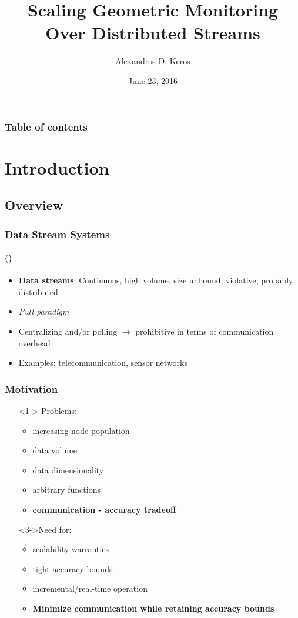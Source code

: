 \documentclass[hyperref={pdfpagelabels=false}]{beamer}
\title{Scaling Geometric Monitoring Over Distributed Streams}
\author{Alexandros D. Keros}
\date{June 23, 2016}
\begin{document}
\begin{frame}
\titlepage
\end{frame} 


\begin{frame}
\frametitle{Table of contents}
\tableofcontents
\end{frame} 

\section{Introduction}
\begin{frame}
  \tableofcontents[currentsection]
 \end{frame}
 
\subsection*{Overview}
\begin{frame} \frametitle{Data Stream Systems}\framesubtitle{\tiny()}
\begin{itemize}
\item \textbf{Data streams}: Continuous, high volume, size unbound, violative, probably distributed
\item \emph{Pull paradigm}
\item Centralizing and/or polling $\rightarrow$ prohibitive in terms of communication overhead
\item Examples: telecommunication, sensor networks 
\end{itemize}
\end{frame}

\begin{frame} \frametitle{Motivation}
\begin{itemize}
\item[]<1-> Problems:
\begin{itemize}
	\item<1-> increasing node population
	\item<1-> data volume
	\item<1-> data dimensionality
	\item<1-> arbitrary functions
	\item<2-> \textbf{communication - accuracy tradeoff}
\end{itemize}
\item[]<3->Need for:
\begin{itemize}
	\item<3-> scalability warranties
	\item<3-> tight accuracy bounds
	\item<3-> incremental/real-time operation
	\item<4-> \textbf{Minimize communication while retaining accuracy bounds}
\end{itemize}
\end{itemize}
\end{frame}
\end{document}
